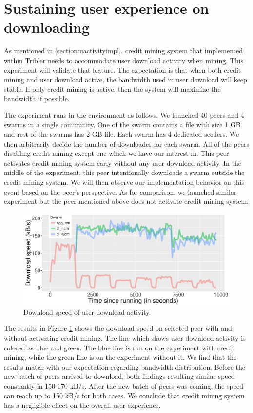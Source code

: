  

\section{Sustaining user experience on downloading}
\label{section:expprio}
As mentioned in \ref{section:uactivityimpl}, credit mining system that implemented within Tribler needs to accommodate user download activity when mining. This experiment will validate that feature. The expectation is that when both credit mining and user download active, the bandwidth used in user download will keep stable. If only credit mining is active, then the system will maximize the bandwidth if possible. 

The experiment runs in the environment as follows. We launched 40 peers and 4 swarms in a single community. One of the swarm contains a file with size 1 GB and rest of the swarms has 2 GB file. Each swarm has 4 dedicated seeders. We then arbitrarily decide the number of downloader for each swarm. All of the peers disabling credit mining except one which we have our interest in. This peer activates credit mining system early without any user download activity. In the middle of the experiment, this peer intentionally downloads a swarm outside the credit mining system. We will then observe our implementation behavior on this event based on the peer's perspective. As for comparison, we launched similar experiment but the peer mentioned above does not activate credit mining system. 

\begin{figure}[h!]
		\centering
		\includegraphics[width=\textwidth]{pics/results/pr_g2-act2.pdf}
		\caption{Download speed of user download activity.}
		\label{fig:cmprio}
\end{figure}

The results in Figure \ref{fig:cmprio} shows the download speed on selected peer with and without activating credit mining. The line which shows user download activity is colored as blue and green. The blue line is run on the experiment with credit mining, while the green line is on the experiment without it. We find that the results match with our expectation regarding bandwidth distribution. Before the new batch of peers arrived to download, both findings resulting similar speed constantly in 150-170 kB/s. After the new batch of peers was coming, the speed can reach up to 150 kB/s for both cases. We conclude that credit mining system has a negligible effect on the overall user experience. 

